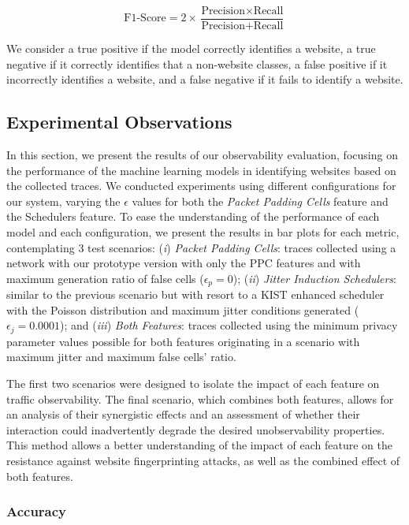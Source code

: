 \[
\text{F1-Score} = 2 \times \frac{\text{Precision} \times \text{Recall}}{\text{Precision} + \text{Recall}}
\]


We consider a true positive if the model correctly identifies a website, a true negative if it correctly identifies that a non-website classes, a false positive if it incorrectly identifies a website, and a false negative if it fails to identify a website. 

\subsection{Experimental Observations}\label{sec:experimental_observations_unobservability}

In this section, we present the results of our observability evaluation, focusing on the performance of the machine learning models in identifying websites based on the collected traces. We conducted experiments using different configurations for our system, varying the $\epsilon$ values for both the \textit{Packet Padding Cells} feature and the Schedulers feature. To ease the understanding of the performance of each model and each configuration, we present the results in bar plots for each metric, contemplating 3 test scenarios: (\emph{i}) \textit{Packet Padding Cells}: traces collected using a network with our prototype version with only the PPC features and with maximum generation ratio of false cells ($\epsilon_p = 0$); (\emph{ii}) \textit{Jitter Induction Schedulers}: similar to the previous scenario but with resort to a KIST enhanced scheduler with the Poisson distribution and maximum jitter conditions generated ($\epsilon_j = 0.0001$); and (\emph{iii}) \textit{Both Features}: traces collected using the minimum privacy parameter values possible for both features originating in a scenario with maximum jitter and maximum false cells' ratio. 

The first two scenarios were designed to isolate the impact of each feature on traffic observability. The final scenario, which combines both features, allows for an analysis of their synergistic effects and an assessment of whether their interaction could inadvertently degrade the desired unobservability properties.
This method allows a better understanding of the impact of each feature on the resistance against website fingerprinting attacks, as well as the combined effect of both features.

\subsubsection{Accuracy}

